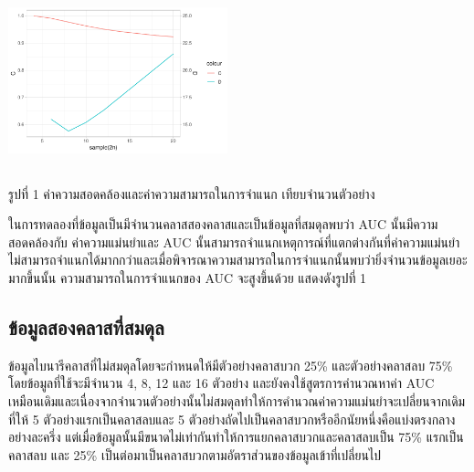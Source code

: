 \documentclass[twoside, twocolumn, 12pt]{article}
\begin{document}
\includegraphics[height=2in,width=2.5in]{pic/Rplot01}
\begin{center} รูปที่ 1 ค่าความสอดคล้องและค่าความสามารถในการจำแนก เทียบจำนวนตัวอย่าง \end{center}

ในการทดลองที่ข้อมูลเป็นมีจำนวนคลาสสองคลาสและเป็นข้อมูลที่สมดุลพบว่า AUC นั้นมีความสอดคล้องกับ ค่าความแม่นยำและ AUC นั้นสามารถจำแนกเหตุการณ์ที่แตกต่างกันที่ค่าความแม่นยำไม่สามารถจำแนกได้มากกว่าและเมื่อพิจารณาความสามารถในการจำแนกนั้นพบว่ายิ่งจำนวนข้อมูลเยอะมากขึ้นนั้น ความสามารถในการจำแนกของ AUC จะสูงขึ้นด้วย แสดงดังรูปที่ 1
\subsection{ข้อมูลสองคลาสที่สมดุล}
\quad ข้อมูลไบนารีคลาสที่ไม่สมดุลโดยจะกำหนดให้มีตัวอย่างคลาสบวก 25\% และตัวอย่างคลาสลบ 75\% โดยข้อมูลที่ใช้จะมีจำนวน 4, 8, 12 และ 16 ตัวอย่าง และยังคงใช้สูตรการคำนวณหาค่า AUC เหมือนเดิมและเนื่องจากจำนวนตัวอย่างนั้นไม่สมดุลทำให้การคำนวณค่าความแม่นยำจะเปลี่ยนจากเดิมที่ให้ 5 ตัวอย่างแรกเป็นคลาสลบและ 5 ตัวอย่างถัดไปเป็นคลาสบวกหรืออีกนัยหนึ่งคือแบ่งตรงกลางอย่างละครึ่ง แต่เมื่อข้อมูลนั้นมีขนาดไม่เท่ากันทำให้การแยกคลาสบวกและคลาสลบเป็น 75\% แรกเป็นคลาสลบ และ 25\% เป็นต่อมาเป็นคลาสบวกตามอัตราส่วนของข้อมูลเข้าที่เปลี่ยนไป
\end{document}
